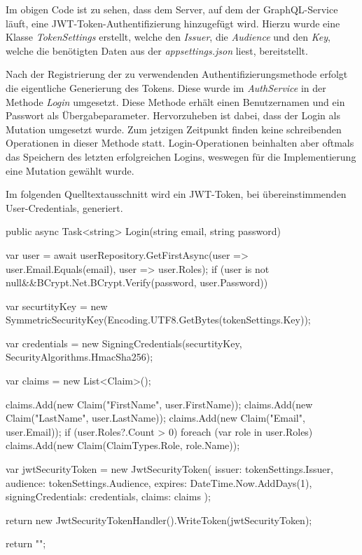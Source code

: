 Im obigen Code ist zu sehen, dass dem Server, auf dem der GraphQL-Service läuft, eine JWT-Token-Authentifizierung hinzugefügt wird.
Hierzu wurde eine Klasse \textit{TokenSettings} erstellt, welche den \textit{Issuer}, die \textit{Audience} und den \textit{Key}, welche die benötigten Daten aus der \textit{appsettings.json} liest, bereitstellt.
\newline

Nach der Registrierung der zu verwendenden Authentifizierungsmethode erfolgt die eigentliche Generierung des Tokens.
Diese wurde im \textit{AuthService} in der Methode \textit{Login} umgesetzt.
Diese Methode erhält einen Benutzernamen und ein Passwort als Übergabeparameter.
Hervorzuheben ist dabei, dass der Login als Mutation umgesetzt wurde.
Zum jetzigen Zeitpunkt finden keine schreibenden Operationen in dieser Methode statt.
Login-Operationen beinhalten aber oftmals das Speichern des letzten erfolgreichen Logins, weswegen für die Implementierung eine Mutation gewählt wurde.
\newline

Im folgenden Quelltextausschnitt wird ein JWT-Token, bei übereinstimmenden User-Credentials, generiert.

\begin{JsCode}
public async Task<string> Login(string email, string password) {
   var user = await userRepository.GetFirstAsync(user => user.Email.Equals(email), user => user.Roles);
   if (user is not null&&BCrypt.Net.BCrypt.Verify(password, user.Password)){
       var securtityKey = new SymmetricSecurityKey(Encoding.UTF8.GetBytes(tokenSettings.Key));
   
       var credentials = new SigningCredentials(securtityKey, SecurityAlgorithms.HmacSha256);
   
       var claims = new List<Claim>();
   
       claims.Add(new Claim("FirstName", user.FirstName));
       claims.Add(new Claim("LastName", user.LastName));
       claims.Add(new Claim("Email", user.Email));
       if (user.Roles?.Count > 0) {
           foreach (var role in user.Roles) {
               claims.Add(new Claim(ClaimTypes.Role, role.Name));
           }
       }
   
       var jwtSecurityToken = new JwtSecurityToken(
           issuer: tokenSettings.Issuer,
           audience: tokenSettings.Audience,
           expires: DateTime.Now.AddDays(1),
           signingCredentials: credentials,
           claims: claims
       );
   
       return new JwtSecurityTokenHandler().WriteToken(jwtSecurityToken);
   }

return "";
}
\end{JsCode}


